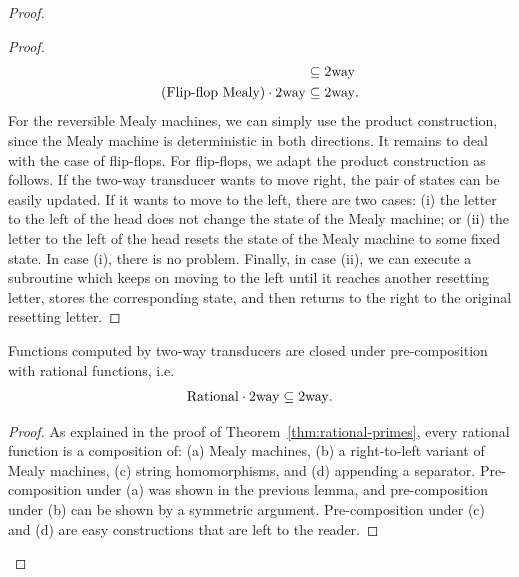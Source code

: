 \begin{proof}
\begin{proof}
\begin{align*}
& \subseteq \mathrm{2way} \\
\text{(Flip-flop Mealy)} \cdot \mathrm{2way} 
& \subseteq \mathrm{2way}.
\end{align*}
For the reversible Mealy machines, we can simply use the product construction, since the Mealy machine is deterministic in both directions. It remains to deal with the case of flip-flops. For flip-flops, we adapt the product construction as follows. If the two-way transducer wants to move right, the pair of states can be easily updated. If it wants to move to the left, there are two cases: (i) the letter to the left of the head does not change the state of the Mealy machine; or (ii) the letter to the left of the head resets the state of the Mealy machine to some fixed state. In case (i), there is no problem. Finally, in case (ii), we can execute a subroutine which keeps on moving to the left until it reaches another resetting letter, stores the corresponding state, and then returns to the right to the original resetting letter.
    \end{proof}

    \begin{corollary}\label{cor:2dfa-closure-under-composition}
        Functions computed by two-way transducers are closed under pre-composition with rational functions, i.e.~
        \begin{align*}        \mathrm{Rational} \cdot \mathrm{2way} 
        \subseteq \mathrm{2way}.   
        \end{align*}
    \end{corollary}
    \begin{proof}
        As explained in the proof of Theorem~\ref{thm:rational-primes}, every rational function is a composition of: (a) Mealy machines, (b) a right-to-left variant of Mealy machines, (c) string homomorphisms, and (d) appending a separator. Pre-composition under (a) was shown in the previous lemma, and pre-composition under (b) can be shown by a symmetric argument. Pre-composition under (c) and (d) are easy constructions that are left to the reader. 
    \end{proof}


\end{proof}

